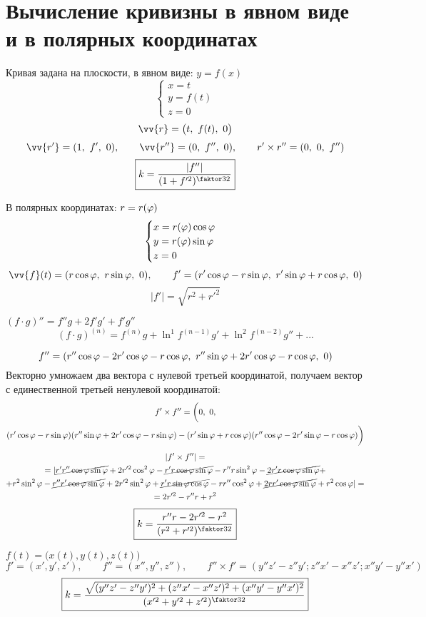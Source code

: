\section{Вычисление кривизны в явном виде и в полярных координатах}

\begin{exmpls}
	\item Кривая задана на плоскости, в явном виде: $ y = f(x) $
	$$
	\begin{cases}
		x = t \\
		y = f(t) \\
		z = 0
	\end{cases} $$
	$$ \vv{r} = \big( t, ~ f(t), ~ 0 \big) $$
	$$ \vv{r'} = (1, ~ f', ~ 0), \qquad \vv{r''} = (0, ~ f'', ~ 0), \qquad r' \times r'' = (0, ~ 0, ~ f'') $$
	$$ \boxed{k = \frac{|f''|}{(1 + f'^2)^{\faktor32}}} $$
	\item В полярных координатах: $ r = r(\varphi) $
	$$
	\begin{cases}
		x = r(\varphi)\cos\varphi \\
		y = r(\varphi)\sin\varphi \\
		z = 0
	\end{cases} $$
	$$ \vv{f}(t) = (r\cos\vphi, ~ r\sin\vphi, ~ 0), \qquad f' = (r'\cos\vphi - r\sin\vphi, ~ r'\sin\vphi + r\cos\vphi, ~ 0) $$
	$$ |f'| = \sqrt{r^2 + r'^2} $$
	\begin{remind}
		$ (f \cdot g)'' = f''g + 2f'g' + f'g'' $
		$$ (f \cdot g)^{(n)} = f^{(n)}g + \ln^1 f^{(n - 1)}g' + \ln^2 f^{(n - 2)}g'' + ... $$
	\end{remind}
	$$ f'' = (r''\cos \varphi - 2r'\cos\varphi - r\cos\varphi, ~ r''\sin\varphi + 2r'\cos\varphi - r\cos\varphi, ~ 0) $$
	Векторно умножаем два вектора с нулевой третьей координатой, получаем вектор с единественной третьей ненулевой координатой:
	\begin{multline*}
		f' \times f'' = \bigg( 0, ~ 0, \\
		(r'\cos\varphi - r\sin\varphi)(r''\sin\varphi + 2r'\cos\varphi - r\sin\varphi) - (r'\sin\varphi + r\cos\varphi)(r''\cos\varphi - 2r'\sin\varphi - r\cos\varphi)\bigg)
	\end{multline*}
	\begin{multline*}
		|f' \times f''| = \\
		= |\cancel{r'r''\cos\varphi\sin\varphi} + 2r'^2\cos^2\varphi - \cancel{r'r\cos\varphi\sin\varphi} - r''r\sin^2\varphi - \cancel{2r'r\cos\varphi\sin\varphi} + \\
		+ r^2\sin^2\varphi - \cancel{r''r'\cos\varphi\sin\varphi} + 2r'^2\sin^2\varphi + \cancel{r'r\sin\varphi\cos\varphi} - rr''\cos^2\varphi + \cancel{2rr'\cos\varphi\sin\varphi} + r^2\cos\varphi| = \\
		= 2r'^2 - r''r + r^2
	\end{multline*}
	$$ \boxed{k = \frac{r''r - 2r'^2 - r^2}{(r^2 + r'^2)^{\faktor32}}} $$
	\item $ f(t) = \bigg(x(t), y(t), z(t) \bigg) $
	$$ f' = (x', y', z'), \qquad f'' = (x'', y'', z''), \qquad f'' \times f' = (y''z' - z''y'; z''x' - x''z'; x''y' - y''x') $$
	$$ \boxed{k =\frac{\sqrt{(y''z' - z''y')^2 + (z''x' - x''z')^2 + (x''y' - y''x')^2}}{(x'^2 + y'^2 + z'^2)^{\faktor32}}} $$
\end{exmpls}

